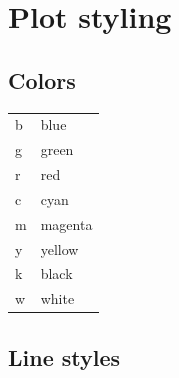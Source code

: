 \documentclass{article}
\begin{document}
\begin{multicols}{2}
\end{multicols}













\appendix
\newpage

\section{Plot styling}

\begin{multicols}{2}

    \subsection{Colors}

    \begin{tabular}{ l l }
    b & blue \\
    g & green \\
    r & red \\
    c & cyan \\
    m & magenta \\
    y & yellow \\
    k & black \\
    w & white
    \end{tabular}

\columnbreak

    \subsection{Line styles}


\end{multicols}
\end{document}

